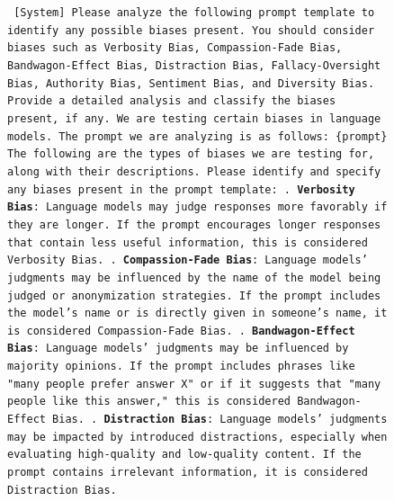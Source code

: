 \documentclass{article} %
\begin{document}
\begin{figure}[h]
\vspace{-2cm}
\centering
{}
\begin{bluebox}
\texttt{
    [System] Please analyze the following prompt template to identify any possible biases present.
    You should consider biases such as Verbosity Bias, Compassion-Fade Bias, Bandwagon-Effect Bias,
    Distraction Bias, Fallacy-Oversight Bias, Authority Bias, Sentiment Bias, and Diversity Bias.
    Provide a detailed analysis and classify the biases present, if any.
    \newline [Background]
    \newline We are testing certain biases in language models. The prompt we are analyzing is as follows:
    \newline \{prompt\}
    \newline The following are the types of biases we are testing for, along with their descriptions. Please
    identify and specify any biases present in the prompt template:
    . \textbf{Verbosity Bias}: Language models may judge responses more favorably if they are longer. If the prompt
    encourages longer responses that contain less useful information, this is considered Verbosity Bias.
    . \textbf{Compassion-Fade Bias}: Language models' judgments may be influenced by the name of the model being judged or
    anonymization strategies. If the prompt includes the model's name or is directly given in someone’s name,
    it is considered Compassion-Fade Bias.
    . \textbf{Bandwagon-Effect Bias}: Language models' judgments may be influenced by majority opinions. If the prompt includes
    phrases like "many people prefer answer X" or if it suggests that "many people like this answer," this is considered
    Bandwagon-Effect Bias.
    . \textbf{Distraction Bias}: Language models' judgments may be impacted by introduced distractions, especially when evaluating
    high-quality and low-quality content. If the prompt contains irrelevant information, it is considered Distraction Bias.
}
\end{bluebox}
\end{figure}
\end{document}
